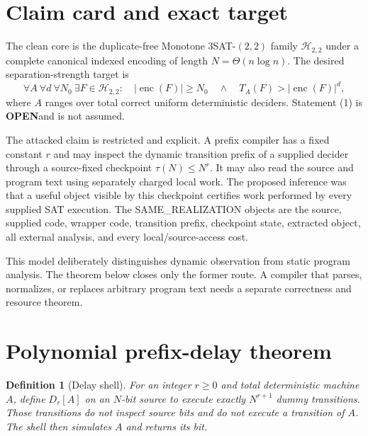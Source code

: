 \documentclass[11pt]{article}
\newtheorem{definition}{Definition}
\newcommand{\Htwo}{\mathcal H_{2,2}}
\newcommand{\OPEN}{\textbf{OPEN}}
\begin{document}
\section{Claim card and exact target}

The clean core is the duplicate-free Monotone $3$SAT-$(2,2)$ family $\Htwo$
under a complete canonical indexed encoding of length $N=\Theta(n\log n)$.
The desired separation-strength target is
\[
 \forall A\ \forall d\ \forall N_0\ \exists F\in\Htwo:\quad
 |\operatorname{enc}(F)|\ge N_0
 \quad\land\quad T_A(F)>|\operatorname{enc}(F)|^d,       \tag{1}
\]
where $A$ ranges over total correct uniform deterministic deciders.  Statement
(1) is \OPEN and is not assumed.

The attacked claim is restricted and explicit.  A prefix compiler has a fixed
constant $r$ and may inspect the dynamic transition prefix of a supplied
decider through a source-fixed checkpoint $\tau(N)\le N^r$.  It may also read
the source and program text using separately charged local work.  The proposed
inference was that a useful object visible by this checkpoint certifies work
performed by every supplied SAT execution.  The SAME\_REALIZATION objects are
the source, supplied code, wrapper code, transition prefix, checkpoint state,
extracted object, all external analysis, and every local/source-access cost.

This model deliberately distinguishes dynamic observation from static program
analysis.  The theorem below closes only the former route.  A compiler that
parses, normalizes, or replaces arbitrary program text needs a separate
correctness and resource theorem.

\section{Polynomial prefix-delay theorem}

\begin{definition}[Delay shell]
For an integer $r\ge0$ and total deterministic machine $A$, define $D_r[A]$
on an $N$-bit source to execute exactly $N^{r+1}$ dummy transitions.  Those
transitions do not inspect source bits and do not execute a transition of
$A$.  The shell then simulates $A$ and returns its bit.
\end{definition}
\end{document}
